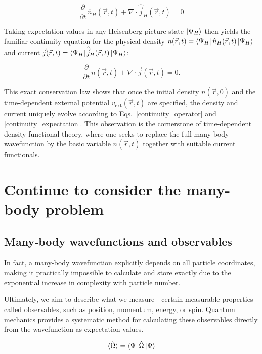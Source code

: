 \begin{equation}
\frac{\partial}{\partial t}\,\hat{n}_H(\vec{r},t)+\nabla\cdot\hat{\vec j}_H(\vec r,t)=0
\label{continuity_operator}
\end{equation}

Taking expectation values in any Heisenberg‐picture state $\ket{\Psi_H}$ then yields the familiar continuity equation for the physical density $n(\vec{r},t)=\bra{\Psi_H}\hat{n}_H(\vec{r},t)\ket{\Psi_H}$
and current $\vec{j}(\vec{r},t)=\bra{\Psi_H}\hat{\vec{j}}_H(\vec{r},t)\ket{\Psi_H}$:

\begin{equation}
    \frac{\partial}{\partial t}\,n(\vec{r},t)+\nabla\cdot\vec{j}(\vec{r},t)=0.
\label{continuity_expectation}
\end{equation}

This exact conservation law shows that once the initial density $n(\vec{r},0)$ and the time‐dependent external potential $v_\mathrm{ext}(\vec{r},t)$ are specified, the density and current uniquely evolve according to Eqs.~\eqref{continuity_operator} and \eqref{continuity_expectation}. This observation is the cornerstone of time‐dependent density functional theory, where one seeks to replace the full many‐body wavefunction by the basic variable $n(\vec{r},t)$ together with suitable current functionals.

\newpage
\section{Continue to consider the many-body problem}

\subsection{Many‐body wavefunctions and observables}

In fact, a many-body wavefunction explicitly depends on all particle coordinates, making it practically impossible to calculate and store exactly due to the exponential increase in complexity with particle number.

Ultimately, we aim to describe what we measure—certain measurable properties called observables, such as position, momentum, energy, or spin. Quantum mechanics provides a systematic method for calculating these observables directly from the wavefunction as expectation values.

\begin{equation}
    \braket{\hat\Omega} = \bra{\Psi}\hat\Omega\ket{\Psi}
    \label{obvious}
\end{equation}

